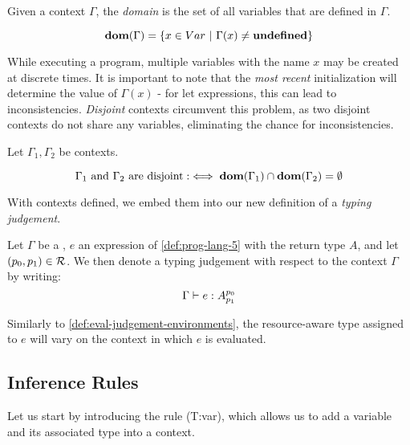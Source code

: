 \begin{definition}\label{def:context-domain}
   Given a context \(\Gamma\), the \emph{domain} is the set of all variables that are defined in \(\Gamma\).
   
   \[
      \textbf{dom}(\Gamma) = \{x \in Var ~|~ \Gamma(x) \neq \textbf{undefined}\} 
   \]
\end{definition}

While executing a program, multiple variables with the name \(x\) may be created at discrete times. It is important to note that the \emph{most recent} initialization will determine the value of \(\Gamma(x)\) - for let expressions, this can lead to inconsistencies. \emph{Disjoint} contexts circumvent this problem, as two disjoint contexts do not share any variables, eliminating the chance for inconsistencies.

\begin{definition}\label{def:disjoint-contexts}
   Let \(\Gamma_1, \Gamma_2\) be contexts. 

   \[
      \Gamma_1 \text{ and } \Gamma_2 \text{ are disjoint} :\iff \textbf{dom}(\Gamma_1) \cap \textbf{dom}(\Gamma_2) = \emptyset
   \]
\end{definition}

With contexts defined, we embed them into our new definition of a \emph{typing judgement}.

\begin{definition}\label{def:type-judgement-context}
   Let \(\Gamma\) be a , \(e\) an expression of \cref{def:prog-lang-5} with the return type \(A\), and let \((p_0, p_1) \in \mathcal{R}\). We then denote a typing judgement with respect to the context \(\Gamma\) by writing:
   \[
      \Gamma \vdash e : A ^{p_0}_{p_1}
   \]
\end{definition}

\begin{remark}
   Similarly to \cref{def:eval-judgement-environments}, the resource-aware type assigned to \(e\) will vary on the context in which \(e\) is evaluated. 
\end{remark}

\subsection{Inference Rules}\label{sec:inference-rules-letvar}

Let us start by introducing the rule (T:var), which allows us to add a variable and its associated type into a context.

